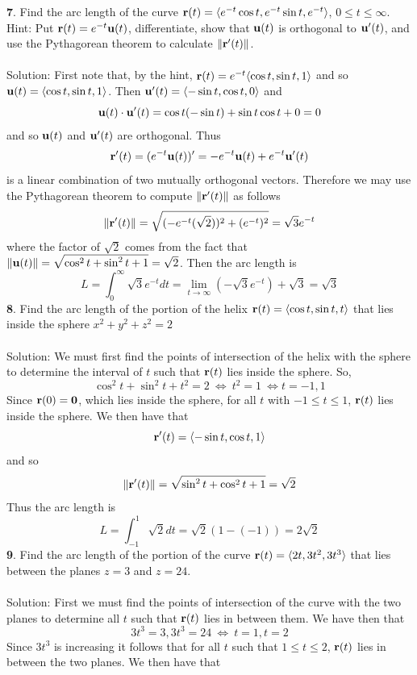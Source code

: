 \documentclass[12pt]{amsbook}
\newcommand{\la}{\langle}
\newcommand{\ra}{\rangle}
\begin{document}
{\small\bf 7}. Find the arc length of the curve ${\bf r}(t)=\la e^{-t}\cos t, e^{-t}\sin t, e^{-t} \ra$, $0 \leq t \leq \infty$. Hint: Put ${\bf r}(t) = e^{-t}{\bf u}(t)$, differentiate, show that ${\bf u}(t)$ is orthogonal to ${\bf u}'(t)$, and use the Pythagorean theorem to calculate $\|{\bf r}'(t)\|$. 
\\
\\
{\sc Solution}: First note that, by the hint, ${\bf r}(t)=e^{-t}\la \cos t, \sin t, 1 \ra$ and so ${\bf u}(t)=\la \cos t, \sin t, 1 \ra$. Then ${\bf u}'(t)=\la -\sin t, \cos t, 0 \ra$ and 
$${\bf u}(t)\cdot {\bf u}'(t)=\cos t (-\sin t)+\sin t \cos t +0 = 0$$
and so ${\bf u}(t)$ and ${\bf u}'(t)$ are orthogonal. Thus
$${\bf r}'(t)=(e^{-t}{\bf u}(t))'=-e^{-t}{\bf u}(t)+e^{-t}{\bf u}'(t)$$
is a linear combination of two mutually orthogonal vectors. Therefore we may use the Pythagorean theorem to compute $\|{\bf r}'(t)\|$ as follows
$$\|{\bf r}'(t)\|=\sqrt{(-e^{-t}(\sqrt{2}))^2+(e^{-t})^2}=\sqrt{3}e^{-t}$$
where the factor of $\sqrt{2}$ comes from the fact that $\|{\bf u}(t)\|=\sqrt{\cos^2 t+\sin^2 t+1}=\sqrt{2}$. Then the arc length is
$$L=\int_0^{\infty}\sqrt{3}e^{-t}dt=\lim_{t\rightarrow \infty}(-\sqrt{3}e^{-t})+\sqrt{3}=\sqrt{3}$$
{\small\bf 8}. Find the arc length of the portion of the helix ${\bf r}(t) = \la \cos t, \sin t, t\ra$ that lies inside the sphere $x^2+y^2+z^2=2$
\\
\\
{\sc Solution}: We must first find the points of intersection of the helix with the sphere to determine the interval of $t$ such that ${\bf r}(t)$ lies inside the sphere. So,
$$\cos^2t + \sin^2 t+t^2=2 \ \Leftrightarrow \ t^2=1  \ \Leftrightarrow t=-1,1$$
Since ${\bf r}(0)={\bf 0}$, which lies inside the sphere, for all $t$ with $-1 \leq t \leq 1$, ${\bf r}(t)$ lies inside the sphere. We then have that
$${\bf r}'(t)=\la - \sin t, \cos t, 1 \ra$$
and so
$$\|{\bf r}'(t)\|=\sqrt{\sin^2 t+\cos^2 t+1}=\sqrt{2}$$
Thus the arc length is
$$L=\int_{-1}^1 \sqrt{2}dt = \sqrt{2}(1-(-1))=2\sqrt{2}$$
{\small\bf 9}. Find the arc length of the portion of the curve ${\bf r}(t)=\la 2t, 3t^2, 3t^3 \ra$ that
lies between the planes $z=3$ and $z=24$. 
\\
\\
{\sc Solution}: First we must find the points of intersection of the curve with the two planes to determine all $t$ such that ${\bf r}(t)$ lies in between them. We have then that
$$3t^3=3,  3t^3=24 \ \Leftrightarrow \ t=1, t=2$$
Since $3t^3$ is increasing it follows that for all $t$ such that $1 \leq t \leq 2$, ${\bf r}(t)$ lies in between the two planes. We then have that
\end{document}
